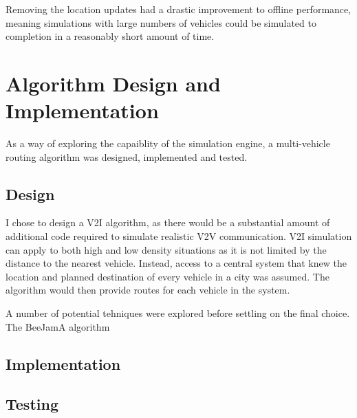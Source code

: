 \documentclass[ %
                    author={Alexander Hill},
                supervisor={Dr. Benjamin Sach},
                    degree={MEng},
                     title={MARMOSET},
                  subtitle={Multi-Agent Route Management using Online Simulation for Efficient Transportation},
                      type={research},
                      year={2016} ]{dissertation}
\begin{document}
Removing the location updates had a drastic improvement to offline performance,
meaning simulations with large numbers of vehicles could be simulated to
completion in a reasonably short amount of time.

\section{Algorithm Design and Implementation}

As a way of exploring the capaiblity of the simulation engine, a multi-vehicle
routing algorithm was designed, implemented and tested.

\subsection{Design}

I chose to design a V2I algorithm, as there would be a substantial amount of
additional code required to simulate realistic V2V communication. V2I simulation
can apply to both high and low density situations as it is not limited by the
distance to the nearest vehicle. Instead, access to a central system that knew
the location and planned destination of every vehicle in a city was assumed. The
algorithm would then provide routes for each vehicle in the system.

A number of potential tehniques were explored before settling on the final
choice. The BeeJamA algorithm \cite{sec:beejama}

\subsection{Implementation}

\subsection{Testing}


\end{document}
